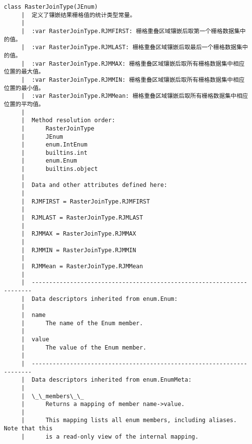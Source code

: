 \documentclass[11pt]{article}
\begin{document}
\begin{Verbatim}[commandchars=\\\{\}]
    class RasterJoinType(JEnum)
     |  定义了镶嵌结果栅格值的统计类型常量。
     |  
     |  :var RasterJoinType.RJMFIRST: 栅格重叠区域镶嵌后取第一个栅格数据集中的值。
     |  :var RasterJoinType.RJMLAST: 栅格重叠区域镶嵌后取最后一个栅格数据集中的值。
     |  :var RasterJoinType.RJMMAX: 栅格重叠区域镶嵌后取所有栅格数据集中相应位置的最大值。
     |  :var RasterJoinType.RJMMIN: 栅格重叠区域镶嵌后取所有栅格数据集中相应位置的最小值。
     |  :var RasterJoinType.RJMMean: 栅格重叠区域镶嵌后取所有栅格数据集中相应位置的平均值。
     |  
     |  Method resolution order:
     |      RasterJoinType
     |      JEnum
     |      enum.IntEnum
     |      builtins.int
     |      enum.Enum
     |      builtins.object
     |  
     |  Data and other attributes defined here:
     |  
     |  RJMFIRST = RasterJoinType.RJMFIRST
     |  
     |  RJMLAST = RasterJoinType.RJMLAST
     |  
     |  RJMMAX = RasterJoinType.RJMMAX
     |  
     |  RJMMIN = RasterJoinType.RJMMIN
     |  
     |  RJMMean = RasterJoinType.RJMMean
     |  
     |  ----------------------------------------------------------------------
     |  Data descriptors inherited from enum.Enum:
     |  
     |  name
     |      The name of the Enum member.
     |  
     |  value
     |      The value of the Enum member.
     |  
     |  ----------------------------------------------------------------------
     |  Data descriptors inherited from enum.EnumMeta:
     |  
     |  \_\_members\_\_
     |      Returns a mapping of member name->value.
     |      
     |      This mapping lists all enum members, including aliases. Note that this
     |      is a read-only view of the internal mapping.
    

\end{Verbatim}
\end{document}
